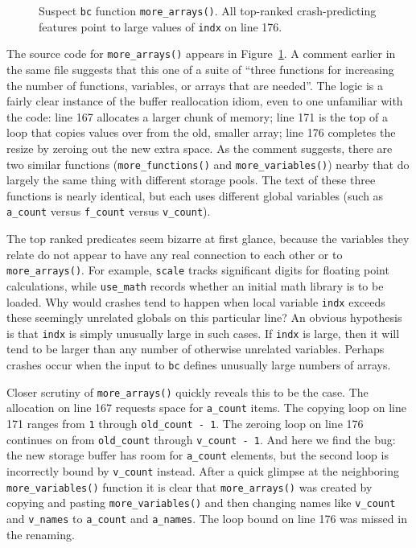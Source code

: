 \begin{figure}
  \centering
  \caption{Suspect \texttt{bc} function \texttt{more\_arrays()}.  All
  top-ranked crash-predicting features point to large values of
  \texttt{indx} on line 176.}
  \label{fig:bc:more-arrays}
\end{figure}

The source code for \texttt{more\_arrays()} appears in
Figure~\ref{fig:bc:more-arrays}.  A comment earlier in the same file
suggests that this one of a suite of ``three functions for increasing
the number of functions, variables, or arrays that are needed''.  The
logic is a fairly clear instance of the buffer reallocation idiom,
even to one unfamiliar with the code: line 167 allocates a larger
chunk of memory; line 171 is the top of a loop that copies values over
from the old, smaller array; line 176 completes the resize by zeroing
out the new extra space.  As the comment suggests, there are two
similar functions (\texttt{more\_functions()} and
\texttt{more\_variables()}) nearby that do largely the same thing with
different storage pools.  The text of these three functions is nearly
identical, but each uses different global variables (such as
\texttt{a\_count} versus \texttt{f\_count} versus \texttt{v\_count}).

The top ranked predicates seem bizarre at first glance, because the
variables they relate do not appear to have any real connection to
each other or to \texttt{more\_arrays()}.  For example, \texttt{scale}
tracks significant digits for floating point calculations, while
\texttt{use\_math} records whether an initial math library is to be
loaded.  Why would crashes tend to happen when local variable
\texttt{indx} exceeds these seemingly unrelated globals on this
particular line?  An obvious hypothesis is that \texttt{indx} is
simply unusually large in such cases.  If \texttt{indx} is large, then
it will tend to be larger than any number of otherwise unrelated
variables.  Perhaps crashes occur when the input to \texttt{bc}
defines unusually large numbers of arrays.

Closer scrutiny of \texttt{more\_arrays()} quickly reveals this to be
the case.  The allocation on line 167 requests space for
\texttt{a\_count} items.  The copying loop on line 171 ranges from
\texttt{1} through \texttt{old\_count - 1}.  The zeroing loop on line
176 continues on from \texttt{old\_count} through \texttt{v\_count -
  1}.  And here we find the bug: the new storage buffer has room for
\texttt{a\_count} elements, but the second loop is incorrectly bound
by \texttt{v\_count} instead.  After a quick glimpse at the
neighboring \texttt{more\_variables()} function it is clear that
\texttt{more\_arrays()} was created by copying and pasting
\texttt{more\_variables()} and then changing names like
\texttt{v\_count} and \texttt{v\_names} to \texttt{a\_count} and
\texttt{a\_names}.  The loop bound on line 176 was missed in the
renaming.

